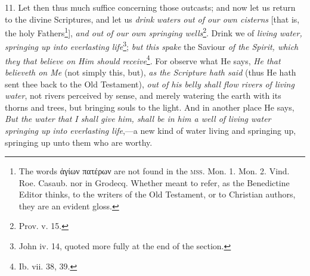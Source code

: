 11. Let then thus much suffice concerning those outcasts; and now let us return to the divine Scriptures, and let us \emph{drink waters out of our own cisterns} [that is, the holy Fathers\footnote{The words \textgreek{ἁγίων πατέρων} are not found in the \textsc{mss.} Mon. 1. Mon. 2. Vind. Roe. Casaub. nor in Grodecq. Whether meant to refer, as the Benedictine Editor thinks, to the writers of the Old Testament, or to Christian authors, they are an evident gloss.}], \emph{and out of our own springing wells}\footnote{Prov. v. 15.}. Drink we of \emph{living water, springing up into everlasting life}\footnote{John iv. 14, quoted more fully at the end of the section.}; \emph{but this spake} the Saviour \emph{of the Spirit, which they that believe on Him should receive}\footnote{Ib. vii. 38, 39.}. For observe what He says, \emph{He that believeth on Me} (not simply this, but), \emph{as the Scripture hath said} (thus He hath sent thee back to the Old Testament), \emph{out of his belly shall flow rivers of living water}, not rivers perceived by sense, and merely watering the earth with its thorns and trees, but bringing souls to the light. And in another place He says, \emph{But the water that I shall give him, shall be in him a well of living water springing up} \emph{into everlasting life},—a new kind of water living and springing up, springing up unto them who are worthy.

